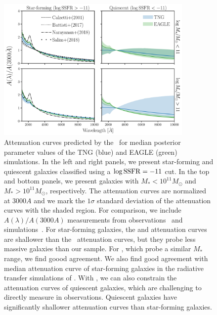 \begin{figure}
\begin{center}
    \includegraphics[width=0.85\textwidth]{figs/abc_attenuation.pdf}
    \caption{\label{fig:atten}
    Attenuation curves predicted by the \eda~for median posterior parameter
    values of the TNG (blue) and EAGLE (green) simulations. In the left and
    right panels, we present star-forming and quiescent galaxies classified
    using a $\log {\rm SSFR} = -11$ cut. In the top and bottom panels, we
    present galaxies with $M_* < 10^{11} M_\odot$ and $M_* > 10^{11} M_\odot$,
    respectively. The attenuation curves are normalized at
    $3000A$ and we mark the $1\sigma$ standard deviation of the attenuation 
    curves with the shaded region. For comparison, we include
    $A(\lambda)/A(3000A)$ measurements from observations~\citep{calzetti2000,
    battisti2017, salim2018} and simulations~\citep{narayanan2018}. 
    For star-forming galaxies, the \cite{calzetti2000} and \cite{battisti2017}
    attenuation curves are shallower than the \eda~attenuation curves, but 
    they probe less massive galaxies than our sample. For \cite{salim2018}, 
    which probe a similar $M_*$ range, we find goood agreement. We also find good agreement with 
    median attenuation curve of star-forming galaxies in the radiative transfer
    simulations of \cite{narayanan2018}.
    With \eda, we can also constrain the attenuation curves of quiescent 
    galaxies, which are challenging to directly measure in observations. 
    Quiescent galaxies have significantly shallower attenuation curves than
    star-forming galaxies.
    }
\end{center}
\end{figure}


